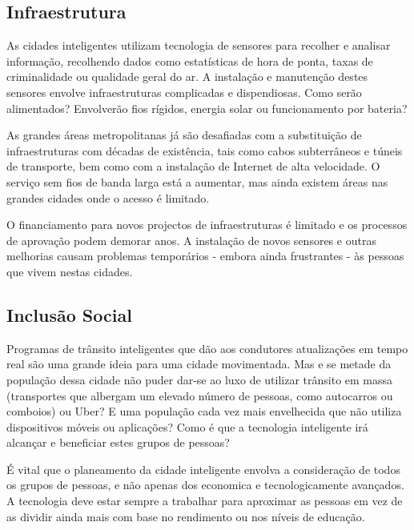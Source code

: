 \documentclass{llncs}
\begin{document}
    \subsection{Infraestrutura}
    \par As cidades inteligentes utilizam tecnologia de sensores para 
    recolher e analisar informação, recolhendo dados como estatísticas de
    hora de ponta, taxas de criminalidade ou qualidade geral do ar. A 
    instalação e manutenção destes sensores envolve infraestruturas
    complicadas e dispendiosas. Como serão alimentados? Envolverão fios 
    rígidos, energia solar ou funcionamento por bateria?
    \par As grandes áreas metropolitanas já são desafiadas com a substituição de infraestruturas com décadas de existência, tais como cabos subterrâneos e túneis de transporte, bem como com a instalação de Internet de alta velocidade. O serviço sem fios de banda larga está a aumentar, mas ainda existem áreas nas grandes cidades onde o acesso é limitado. 
    \par O financiamento para novos projectos de infraestruturas é limitado e os processos de aprovação podem demorar anos. A instalação de novos sensores e outras melhorias causam problemas temporários - embora ainda frustrantes - às pessoas que vivem nestas cidades.
    
    
    \subsection{Inclusão Social}
    \par Programas de trânsito inteligentes que dão aos condutores atualizações em tempo real são uma grande ideia para uma cidade movimentada. Mas e se metade da população dessa cidade não puder dar-se ao luxo de utilizar trânsito em massa (transportes que albergam um elevado número de pessoas, como autocarros ou comboios) ou Uber? E uma população cada vez mais envelhecida que não utiliza dispositivos móveis ou aplicações? Como é que a tecnologia inteligente irá alcançar e beneficiar estes grupos de pessoas?
    \par É vital que o planeamento da cidade inteligente envolva a consideração de todos os grupos de pessoas, e não apenas dos economica e tecnologicamente avançados. A tecnologia deve estar sempre a trabalhar para aproximar as pessoas em vez de as dividir ainda mais com base no rendimento ou nos níveis de educação.
    
    
    
\end{document}
